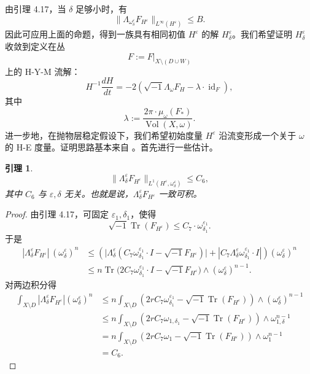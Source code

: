 \documentclass[12pt,a4paper]{article}
\newtheorem{lemma}[theorem]{引理}
\newcommand{\Tr}{\operatorname{Tr}}
\newcommand{\Vol}{\operatorname{Vol}}
\newcommand{\Id}{\operatorname{id}}
\begin{document}
由引理 4.17，当 \(\delta\) 足够小时，有
\[
\|\Lambda_{\omega^\varepsilon_\delta}F_{H^\varepsilon}\|_{L^\infty(H^\varepsilon)}\le B.
\]
因此可应用上面的命题，得到一族具有相同初值 \(H^\varepsilon\) 的解 \(H^\varepsilon_\delta\)。我们希望证明 \(H^\varepsilon_\delta\) 收敛到定义在丛
\[
F:=F|_{X\setminus(D\cup W)}
\]
上的 H-Y-M 流解：
\[
H^{-1}\frac{dH}{dt}
=
-2\left(\sqrt{-1}\Lambda_\omega F_H-\lambda\cdot \Id_F\right), \tag{23}
\]
其中
\[
\lambda:=\frac{2\pi\cdot \mu_\omega(F_*)}{\Vol(X,\omega)}.
\]
进一步地，在抛物层稳定假设下，我们希望初始度量 \(H^\varepsilon\) 沿流变形成一个关于 \(\omega\) 的 H-E 度量。证明思路基本来自 \cite{BandoSiu}。首先进行一些估计。

\begin{lemma}
\[
\|\Lambda^\varepsilon_\delta F_{H^\varepsilon}\|_{L^1(H^\varepsilon,\omega^\varepsilon_\delta)}\le C_6,
\]
其中 \(C_6\) 与 \(\varepsilon,\delta\) 无关。也就是说，\(\Lambda^\varepsilon_\delta F_{H^\varepsilon}\) 一致可积。
\end{lemma}

\begin{proof}
由引理 4.17，可固定 \(\varepsilon_1,\delta_1\)，使得
\[
\sqrt{-1}\Tr(F_{H^\varepsilon})\le C_7\cdot \omega^{\varepsilon_1}_{\delta_1}.
\]
于是
\begin{align*}
|\Lambda^\varepsilon_\delta F_{H^\varepsilon}|\,(\omega^\varepsilon_\delta)^n
&\le
\left(
\bigl|\Lambda^\varepsilon_\delta(C_7\omega^{\varepsilon_1}_{\delta_1}\cdot I-\sqrt{-1}F_{H^\varepsilon})\bigr|
+
|C_7\Lambda^\varepsilon_\delta \omega^{\varepsilon_1}_{\delta_1}\cdot I|
\right)
(\omega^\varepsilon_\delta)^n
\\
&\le
n\Tr\bigl(2C_7\omega^{\varepsilon_1}_{\delta_1}\cdot I-\sqrt{-1}F_{H^\varepsilon}\bigr)\wedge (\omega^\varepsilon_\delta)^{n-1}.
\end{align*}
对两边积分得
\begin{align*}
\int_{X\setminus D}
|\Lambda^\varepsilon_\delta F_{H^\varepsilon}|(\omega^\varepsilon_\delta)^n
&\le
n\int_{X\setminus D}
(2rC_7\omega^{\varepsilon_1}_{\delta_1}-\sqrt{-1}\Tr(F_{H^\varepsilon}))\wedge (\omega^\varepsilon_\delta)^{n-1}
\\
&\le
n\int_{X\setminus D}
(2rC_7\omega_{1,\delta_1}-\sqrt{-1}\Tr(F_{H^\varepsilon}))\wedge \omega_{1,\delta}^{n-1}
\\
&=
n\int_{X\setminus D}
(2rC_7\omega_1-\sqrt{-1}\Tr(F_{H^\varepsilon}))\wedge \omega_1^{n-1}
\\
&=C_6.
\end{align*}
\end{proof}
\end{document}
